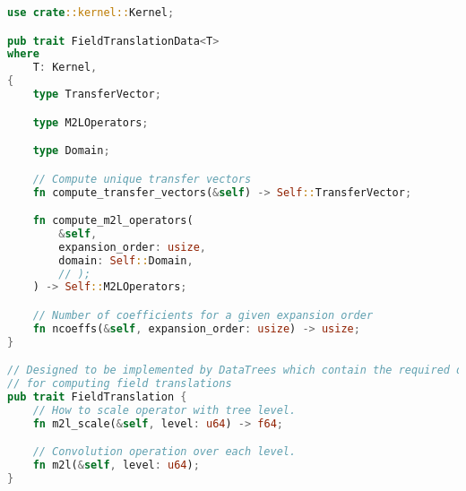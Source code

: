 \begin{lstlisting}[language=Rust, caption={Traits for Multipole to Local Translation},  label=code:app:fmm_traits:field_translation]
use crate::kernel::Kernel;

pub trait FieldTranslationData<T>
where
    T: Kernel,
{
    type TransferVector;

    type M2LOperators;

    type Domain;

    // Compute unique transfer vectors
    fn compute_transfer_vectors(&self) -> Self::TransferVector;

    fn compute_m2l_operators(
        &self,
        expansion_order: usize,
        domain: Self::Domain,
        // );
    ) -> Self::M2LOperators;

    // Number of coefficients for a given expansion order
    fn ncoeffs(&self, expansion_order: usize) -> usize;
}

// Designed to be implemented by DataTrees which contain the required data
// for computing field translations
pub trait FieldTranslation {
    // How to scale operator with tree level.
    fn m2l_scale(&self, level: u64) -> f64;

    // Convolution operation over each level.
    fn m2l(&self, level: u64);
}
\end{lstlisting}


\begin{lstlisting}[language=Rust, caption={Traits for Kernel Functions},  label=code:app:fmm_traits:kernel]

\end{lstlisting}


\begin{lstlisting}[language=Rust, caption={Traits for Kernel Functions},  label=code:app:fmm_traits:kernel]

\end{lstlisting}